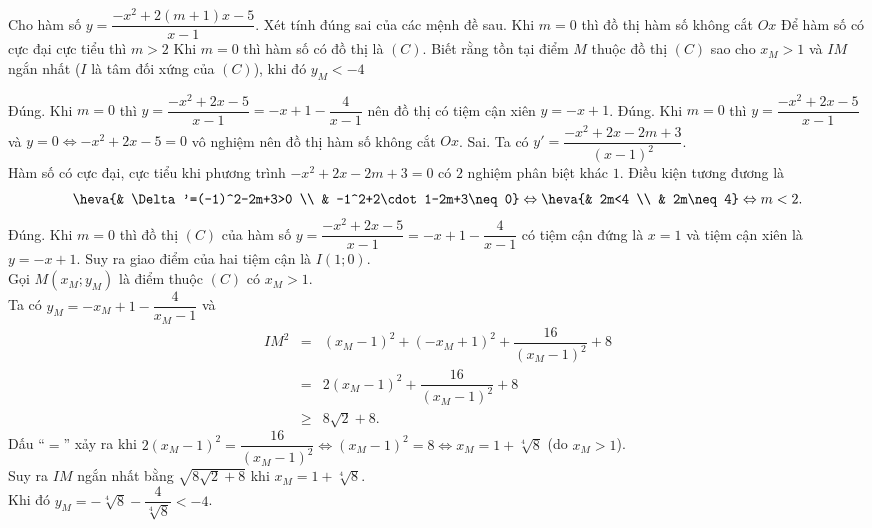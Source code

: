 \TNTF
\begin{ex}%
Cho hàm số $y=\dfrac{-x^2+2(m+1)x-5}{x-1}$. Xét tính đúng sai của các mệnh đề sau.
{\True Khi $m=0$ thì đồ thị hàm số không cắt $Ox$}
{Để hàm số có cực đại cực tiểu thì $m>2$}
{\True Khi $m=0$ thì hàm số có đồ thị là $(C)$. Biết rằng tồn tại điểm $M$ thuộc đồ thị $(C)$ sao cho $x_M>1$  và $IM$ ngắn nhất ($I$ là tâm đối xứng của $(C)$), khi đó $y_M<-4$}
\loigiai
{\begin{itemchoice}
\itemch Đúng. Khi $m=0$ thì $y=\dfrac{-x^2+2x-5}{x-1}=-x+1-\dfrac{4}{x-1}$ nên đồ thị có tiệm cận xiên $y=-x+1$.
\itemch Đúng. Khi $m=0$ thì $y=\dfrac{-x^2+2x-5}{x-1}$ và $y=0\Leftrightarrow -x^2+2x-5=0$ vô nghiệm nên đồ thị hàm số không cắt $Ox$.
\itemch Sai. Ta có $y'=\dfrac{-x^2+2x-2m+3}{(x-1)^2}$.\\
Hàm số có cực đại, cực tiểu khi phương trình $-x^2+2x-2m+3=0$ có $2$ nghiệm phân biệt khác $1$. Điều kiện tương đương là
$$\heva{& \Delta'=(-1)^2-2m+3>0 \\ & -1^2+2\cdot 1-2m+3\neq 0}\Leftrightarrow\heva{& 2m<4 \\ & 2m\neq 4}\Leftrightarrow m<2.$$
\itemch Đúng. Khi $m=0$ thì đồ thị $(C)$ của hàm số $y=\dfrac{-x^2+2x-5}{x-1}=-x+1-\dfrac{4}{x-1}$ có tiệm cận đứng là $x=1$ và tiệm cận xiên là $y=-x+1$. Suy ra giao điểm của hai tiệm cận là $I(1;0)$.\\
Gọi $M\left(x_M;y_M\right)$ là điểm thuộc $(C)$ có $x_M>1$.\\
Ta có $y_M=-x_M+1-\dfrac{4}{x_M-1}$ và \begin{eqnarray*}
IM^2&=&\left(x_M-1\right)^2+\left(-x_M+1\right)^2+\dfrac{16}{\left(x_M-1\right)^2}+8\\
&=&2\left(x_M-1\right)^2+\dfrac{16}{\left(x_M-1\right)^2}+8\\
&\geq & 8\sqrt{2}+8.
\end{eqnarray*}
Dấu ``$=$'' xảy ra khi $2\left(x_M-1\right)^2=\dfrac{16}{\left(x_M-1\right)^2}\Leftrightarrow\left(x_M-1\right)^2=8\Leftrightarrow x_M=1+\sqrt[4]{8}$ (do $x_M>1$).\\
Suy ra $IM$ ngắn nhất bằng $\sqrt{8\sqrt{2}+8}$ khi $x_M=1+\sqrt[4]{8}$.\\
Khi đó $y_M=-\sqrt[4]{8}-\dfrac{4}{\sqrt[4]{8}}<-4$.
\end{itemchoice}
}
\end{ex}


